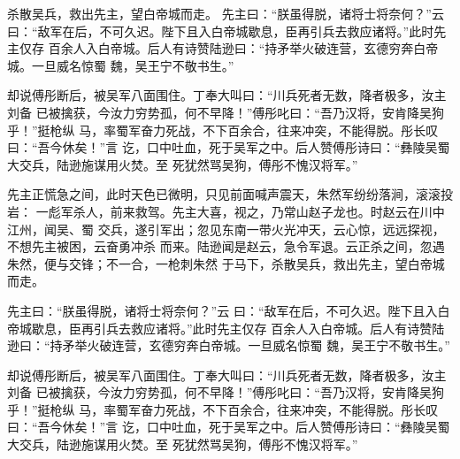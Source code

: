 \documentclass[UTF8,12pt,twoside,a4paper]{ctexart} %
\begin{document}
	\begin{flushleft}

\indent\setlength{\parindent}{2em}%
						\songti
						\hspace{1.6em}%
杀散吴兵，救出先主，望白帝城而走。\cite{RN2}
先主曰：“朕虽得脱，诸将士将奈何？”云
曰：“敌军在后，不可久迟。陛下且入白帝城歇息，臣再引兵去救应诸将。”此时先主仅存
百余人入白帝城。后人有诗赞陆逊曰：“持矛举火破连营，玄德穷奔白帝城。一旦威名惊蜀
魏，吴王宁不敬书生。”

    却说傅彤断后，被吴军八面围住。丁奉大叫曰：“川兵死者无数，降者极多，汝主刘备
已被擒获，今汝力穷势孤，何不早降！”傅彤叱曰：“吾乃汉将，安肯降吴狗乎！”挺枪纵
马，率蜀军奋力死战，不下百余合，往来冲突，不能得脱。彤长叹曰：“吾今休矣！”言
讫，口中吐血，死于吴军之中。后人赞傅彤诗曰：“彝陵吴蜀大交兵，陆逊施谋用火焚。至
死犹然骂吴狗，傅彤不愧汉将军。”


	\end{flushleft}%
\clearpage{\pagestyle{empty}\cleardoublepage}%


	\begin{center}
	\heiti{\zihao{2}{第二章~研究目的以及意义}}
	\end{center}
\vspace*{10pt}

\begin{flushleft}
\indent\setlength{\parindent}{2em}%
						\songti
						\hspace{1.6em}%
先主正慌急之间，此时天色已微明，只见前面喊声震天，朱然军纷纷落涧，滚滚投岩：
一彪军杀人，前来救驾。先主大喜，视之，乃常山赵子龙也。时赵云在川中江州，闻吴、蜀
交兵，遂引军出；忽见东南一带火光冲天，云心惊，远远探视，不想先主被困，云奋勇冲杀
而来。陆逊闻是赵云，急令军退。云正杀之间，忽遇朱然，便与交锋；不一合，一枪刺朱然
于马下，杀散吴兵，救出先主，望白帝城而走。

先主曰：“朕虽得脱，诸将士将奈何？”云
曰：“敌军在后，不可久迟。陛下且入白帝城歇息，臣再引兵去救应诸将。”此时先主仅存
百余人入白帝城。后人有诗赞陆逊曰：“持矛举火破连营，玄德穷奔白帝城。一旦威名惊蜀
魏，吴王宁不敬书生。”

    却说傅彤断后，被吴军八面围住。丁奉大叫曰：“川兵死者无数，降者极多，汝主刘备
已被擒获，今汝力穷势孤，何不早降！”傅彤叱曰：“吾乃汉将，安肯降吴狗乎！”挺枪纵
马，率蜀军奋力死战，不下百余合，往来冲突，不能得脱。彤长叹曰：“吾今休矣！”言
讫，口中吐血，死于吴军之中。后人赞傅彤诗曰：“彝陵吴蜀大交兵，陆逊施谋用火焚。至
死犹然骂吴狗，傅彤不愧汉将军。”


	\end{flushleft}%
\end{document}
